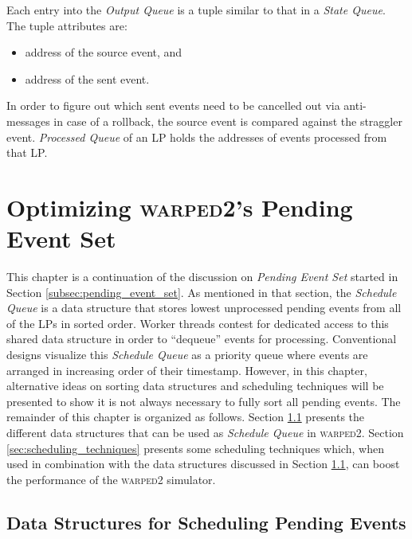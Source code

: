 \documentclass[11pt]{book}
\begin{document}
\noindent
Each entry into the \emph{Output Queue} is a tuple similar to that in a \emph{State Queue}.
The tuple attributes are:

\begin{itemize}
\item address of the source event, and
\item address of the sent event.
\end{itemize}

\noindent
In order to figure out which sent events need to be cancelled out via anti-messages in case of a rollback, the
source event is compared against the straggler event. \emph{Processed Queue} of an LP holds the addresses of
events processed from that LP.

\chapter[\textsc{Pending Event Set}]{Optimizing \textsc{warped2}'s Pending Event Set}\label{chapter:event_scheduling}

This chapter is a continuation of the discussion on \emph{Pending Event Set} started in Section
\ref{subsec:pending_event_set}.  As mentioned in that section, the \emph{Schedule Queue} is a data structure
that stores lowest unprocessed pending events from all of the LPs in sorted order.  Worker threads contest for
dedicated access to this shared data structure in order to ``dequeue'' events for processing.  Conventional
designs visualize this \emph{Schedule Queue} as a priority queue where events are arranged in increasing order
of their timestamp.  However, in this chapter, alternative ideas on sorting data structures and scheduling
techniques will be presented to show it is not always necessary to fully sort all pending events.  The
remainder of this chapter is organized as follows.  Section \ref{sec:data_structures} presents the different
data structures that can be used as \emph{Schedule Queue} in \textsc{warped2}.  Section
\ref{sec:scheduling_techniques} presents some scheduling techniques which, when used in combination with the
data structures discussed in Section \ref{sec:data_structures}, can boost the performance of the
\textsc{warped2} simulator.

\section[\textsc{Data Structures}]{Data Structures for Scheduling Pending Events}\label{sec:data_structures}
\end{document}
